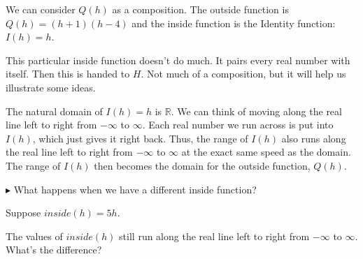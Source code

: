 \documentclass{ximera}
\begin{document}
\begin{image}
\end{image}


We can consider $Q(h)$ as a composition.  The outside function is $Q(h) = (h+1)(h-4)$ and the inside function is the Identity function: $I(h)=h$.  

This particular inside function doesn't do much.  It pairs every real number with itself.  Then this is handed to $H$. Not much of a composition, but it will help us illustrate some ideas.



The natural domain of $I(h)=h$ is \textbf{$\mathbb{R}$}.  We can think of moving along the real line left to right from $-\infty$ to $\infty$.  Each real number we run across is put into $I(h)$, which just gives it right back.  Thus, the range of $I(h)$ also runs along the real line left to right from $-\infty$ to $\infty$ at the exact same speed as the domain.  The range of $I(h)$ then becomes the domain for the outside function, $Q(h)$. 



$\blacktriangleright$  What happens when we have a different inside function? 


Suppose $inside(h) = 5h$.


The values of $inside(h)$ still run along the real line left to right from $-\infty$ to $\infty$. What's the difference?
\end{document}
